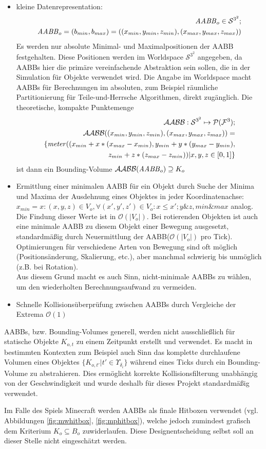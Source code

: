 \begin{itemize}
\item kleine Datenrepresentation:
\begin{align}
\mathit{AABB}_o \in \mathcal{S}^{3^2};\\
\mathit{AABB}_o = (b_{min}, b_{max}) = ((x_{min}, y_{min}, z_{min}), (x_{max}, y_{max}, z_{max}))
\end{align}
		 Es werden nur absolute Minimal- und Maximalpositionen der AABB festgehalten.
		 Diese Positionen werden im Worldspace $\mathcal{S}^{3^2}$ angegeben, da AABBs hier die primäre vereinfachende Abstraktion sein sollen, die in der Simulation für Objekte verwendet wird. Die Angabe im Worldspace macht AABBs für Berechnungen im absoluten, zum Beispiel räumliche Partitionierung für Teile-und-Herrsche Algorithmen, direkt zugänglich.
		 Die theoretische, kompakte Punktemenge 
		 \begin{align}
		 \mathcal{AABB}: \mathcal{S}^{3^2} \mapsto \mathcal{P}(\mathcal{F}^3);\\
		 \mathcal{AABB} ((x_{min}, y_{min}, z_{min}), (x_{max}, y_{max}, z_{max})) = \\
		 \{\mathit{meter}((x_{min} + x * (x_{max} - x_{min}), y_{min} + y * (y_{max} - y_{min}),\\
		  z_{min} + z * (z_{max} - z_{min}))| x, y, z \in [0,1] \} 
		 \end{align}
		 ist dann ein Bounding-Volume $\mathcal{AABB}(\mathit{AABB}_o) \supseteq K_o$
	\item Ermittlung einer minimalen AABB für ein Objekt durch Suche der Minima und Maxima der Ausdehnung eines Objektes in jeder Koordinatenachse:
	 $x_{min} = x : (x, y, z) \in V_o , \forall (x', y', z') \in V_o: x \leq x'; y \& z, min \& max $ analog.
	 Die Findung dieser Werte ist in $ \mathcal{O}(|V_o|) $.
		Bei rotierenden Objekten ist auch eine minimale AABB zu diesem Objekt einer Bewegung ausgesetzt, standardmäßig durch Neuermittlung der AABB($\mathcal{O}(|V_o|)$ pro Tick). Optimierungen für verschiedene Arten von Bewegung sind oft möglich (Positionsänderung, Skalierung, etc.), aber manchmal schwierig bis unmöglich (z.B. bei Rotation).\\
		Aus diesem Grund macht es auch Sinn, nicht-minimale AABBs zu wählen, um den wiederholten Berechnungsaufwand zu vermeiden.
	\item Schnelle Kollisionsüberprüfung zwischen AABBs durch Vergleiche der Extrema $\mathcal{O}(1)$
\end{itemize}

AABBs, bzw. Bounding-Volumes generell, werden nicht ausschließlich für statische Objekte $K_{o,t}$ zu einem Zeitpunkt erstellt und verwendet. Es macht in bestimmten Kontexten zum Beispiel auch Sinn das komplette durchlaufene Volumen eines Objektes $\{K_{o,t'} | t' \in \Upsilon_{\delta_i}\}$ während eines Ticks durch ein Bounding-Volume zu abstrahieren. Dies ermöglicht korrekte Kollisionsfilterung unabhängig von der Geschwindigkeit und wurde deshalb für dieses Projekt standardmäßig verwendet.

Im Falle des Spiels Minecraft werden AABBs als finale Hitboxen verwendet (vgl. Abbildungen \ref{fig:mwhitbox}, \ref{fig:mphitbox}), welche jedoch zumindest grafisch dem Kriterium $K_o \subseteq B_o$ zuwiderlaufen. Diese Designentscheidung selbst soll an dieser Stelle nicht eingeschätzt werden.